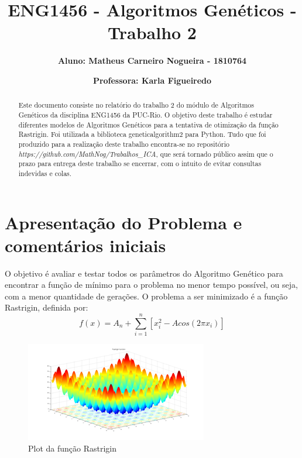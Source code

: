 \documentclass[12pt]{article}
\title{\textbf{ENG1456 - Algoritmos Genéticos - Trabalho 2}}
\author{\textbf{Aluno: Matheus Carneiro Nogueira - 1810764}}
\affil{}
\author{\textbf{Professora: Karla Figueiredo}}
\affil{}
\date{}
\begin{document}
	\maketitle
	
	
	\begin{abstract}
		Este documento consiste no relatório do trabalho 2 do módulo de Algoritmos Genéticos da disciplina ENG1456 da PUC-Rio. O objetivo deste trabalho é estudar diferentes modelos de Algoritmos Genéticos para a tentativa de otimização da função Rastrigin. Foi utilizada a biblioteca geneticalgorithm2 para Python. Tudo que foi produzido para a realização deste trabalho encontra-se no repositório \textit{https://github.com/MathNog/Trabalhos\_ICA}, que será tornado público assim que o prazo para entrega deste trabalho se encerrar, com o intuito de evitar consultas indevidas e colas.
	\end{abstract}
	
	\section{Apresentação do Problema e comentários iniciais}
	
	O objetivo é avaliar e testar todos os parâmetros do Algoritmo Genético para encontrar a função de mínimo para o problema no menor tempo possível, ou seja, com a menor quantidade de gerações. O problema a ser minimizado é a função Rastrigin, definida por:
	\begin{equation*}
		f(x)=A_n+\sum_{i=1}^{n}[x_i^2-Acos(2\pi x_i)]
	\end{equation*}
	
	\begin{figure}[H]
		\centering
		\includegraphics[width=0.9\linewidth]{Imagens/Rastrigin_function}
		\caption{Plot da função Rastrigin}
		\label{fig:rastriginfunction}
	\end{figure}
	
\end{document}
